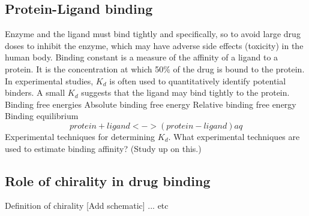 \subsection{Protein-Ligand binding}
\begin{outline}
	\1 Enzyme and the ligand must bind tightly and specifically, so to avoid large drug doses to inhibit the enzyme, which may have adverse side effects (toxicity) in the human body.
	\1 Binding constant is a measure of the affinity of a ligand to a protein. It is the concentration at which 50\% of the drug is bound to the protein. In experimental studies, $K_d$ is often used to quantitatively identify potential binders. A small $K_d$ suggests that the ligand may bind tightly to the protein.
	\1 Binding free energies
		\2 Absolute binding free energy
		\2 Relative binding free energy
		\2 Binding equilibrium
			\[ protein+ligand <-> (protein-ligand)aq \]
	\1 Experimental techniques for determining $K_d$. 
		\2 What experimental techniques are used to estimate binding affinity? (Study up on this.)
\end{outline}	

\subsection{Role of chirality in drug binding}
Definition of chirality [Add schematic] ... etc


